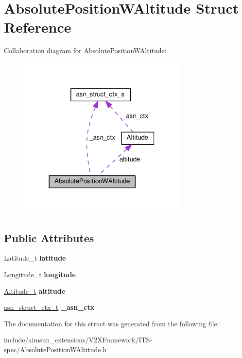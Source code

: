 \hypertarget{structAbsolutePositionWAltitude}{}\section{Absolute\+Position\+W\+Altitude Struct Reference}
\label{structAbsolutePositionWAltitude}


Collaboration diagram for Absolute\+Position\+W\+Altitude\+:\nopagebreak
\begin{figure}[H]
\begin{center}
\leavevmode
\includegraphics[width=242pt]{structAbsolutePositionWAltitude__coll__graph}
\end{center}
\end{figure}
\subsection*{Public Attributes}
\begin{DoxyCompactItemize}
\item 
Latitude\+\_\+t {\bfseries latitude}\hypertarget{structAbsolutePositionWAltitude_a76d49a7c3f65e73f667fa3f69351892b}{}\label{structAbsolutePositionWAltitude_a76d49a7c3f65e73f667fa3f69351892b}

\item 
Longitude\+\_\+t {\bfseries longitude}\hypertarget{structAbsolutePositionWAltitude_a81b17381c5f86c2163d1f1b26a345c59}{}\label{structAbsolutePositionWAltitude_a81b17381c5f86c2163d1f1b26a345c59}

\item 
\hyperlink{structAltitude}{Altitude\+\_\+t} {\bfseries altitude}\hypertarget{structAbsolutePositionWAltitude_a8a8a31cfa85a6644f8e87b9769c0ea61}{}\label{structAbsolutePositionWAltitude_a8a8a31cfa85a6644f8e87b9769c0ea61}

\item 
\hyperlink{structasn__struct__ctx__s}{asn\+\_\+struct\+\_\+ctx\+\_\+t} {\bfseries \+\_\+asn\+\_\+ctx}\hypertarget{structAbsolutePositionWAltitude_a6983ea6a5f4f8901a244f0c365f222a6}{}\label{structAbsolutePositionWAltitude_a6983ea6a5f4f8901a244f0c365f222a6}

\end{DoxyCompactItemize}


The documentation for this struct was generated from the following file\+:\begin{DoxyCompactItemize}
\item 
include/aimsun\+\_\+extensions/\+V2\+X\+Framework/\+I\+T\+S-\/spec/Absolute\+Position\+W\+Altitude.\+h\end{DoxyCompactItemize}
